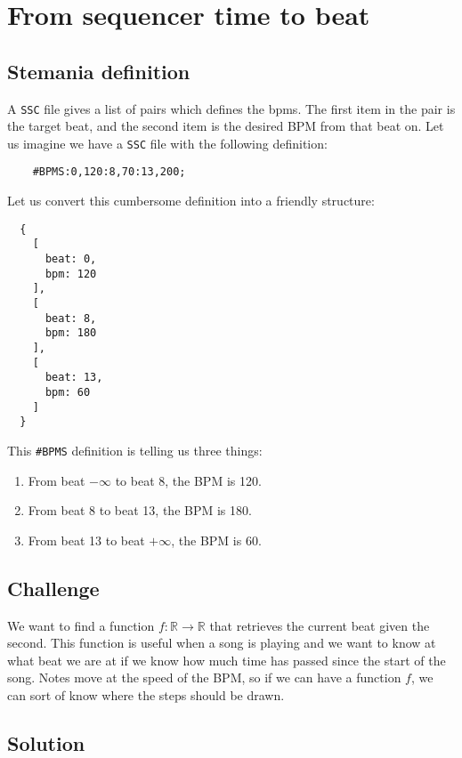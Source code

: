 \documentclass[a4paper,9pt]{article}
\begin{document}
    \section{From sequencer time to beat}

    \subsection{Stemania definition}\label{sec:stepmania-definition-time2beat}
    
    A \texttt{SSC} file gives a list of pairs which defines the bpms. The first item in the pair is the target beat, and the second item is the desired BPM from that beat on. Let us imagine we have a \texttt{SSC} file with the following definition:
    \begin{verbatim}
    #BPMS:0,120:8,70:13,200;     
    \end{verbatim}
    Let us convert this cumbersome definition into a friendly structure:
    \begin{verbatim}
  {
    [
      beat: 0,
      bpm: 120
    ],
    [
      beat: 8,
      bpm: 180 
    ],
    [
      beat: 13,
      bpm: 60 
    ]
  }
    \end{verbatim}

    This \texttt{\#BPMS} definition is telling us three things:
    \begin{enumerate}
	    \item From beat $- \infty$ to beat 8, the BPM is 120.
	    \item From beat 8 to beat 13, the BPM is 180.
	    \item From beat 13 to beat $+\infty$, the BPM is 60.
    \end{enumerate}

    \subsection{Challenge}

    We want to find a function $f : \mathbb{R} \rightarrow \mathbb{R}$ that retrieves the current beat given the second.  This function is useful when a song is playing and we want to know at what beat we are at if we know how much time has passed since the start of the song. Notes move at the speed of the BPM, so if we can have a function $f$, we can sort of know where the steps should be drawn.

    \subsection{Solution}
\end{document}
